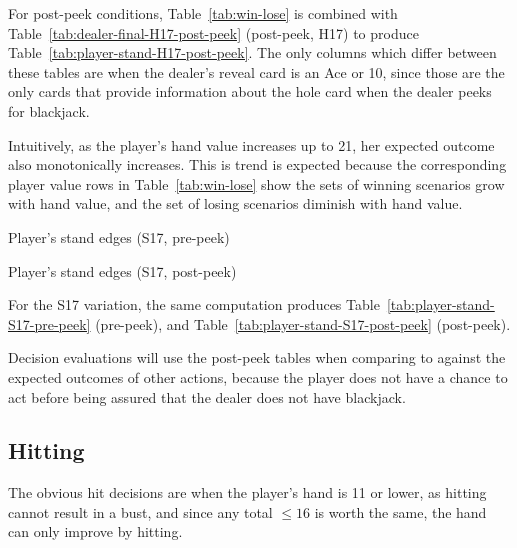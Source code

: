 For post-peek conditions, Table~\ref{tab:win-lose} is combined with
Table~\ref{tab:dealer-final-H17-post-peek} (post-peek, H17) to produce
Table~\ref{tab:player-stand-H17-post-peek}.
The only columns which differ between these tables are when
the dealer's reveal card is an Ace or 10, since those are the only cards
that provide information about the hole card
when the dealer peeks for blackjack.

Intuitively, as the player's hand value increases up to 21, 
her expected outcome also monotonically increases.
This is trend is expected because the corresponding player value rows in
Table~\ref{tab:win-lose} show the sets of winning scenarios
grow with hand value, and the set of losing scenarios diminish with
hand value.  

\begin{table}[ht!]
\caption{Player's stand edges (S17, pre-peek)}
\begin{center}

\end{center}
\label{tab:player-stand-S17-pre-peek}
\end{table}

\begin{table}[ht!]
\caption{Player's stand edges (S17, post-peek)}
\begin{center}

\end{center}
\label{tab:player-stand-S17-post-peek}
\end{table}

For the S17 variation, the same computation produces
Table~\ref{tab:player-stand-S17-pre-peek} (pre-peek), and
Table~\ref{tab:player-stand-S17-post-peek} (post-peek).

Decision evaluations will use the post-peek tables when
comparing to against the expected outcomes of other actions, 
because the player does not have a chance to act before
being assured that the dealer does not have blackjack.  

\subsection{Hitting}
\label{sec:basic:hit-stand:hit}

The obvious hit decisions are when the player's hand is 11 or lower,
as hitting cannot result in a bust, and since any total $\le{}16$ is
worth the same, the hand can only improve by hitting.  

